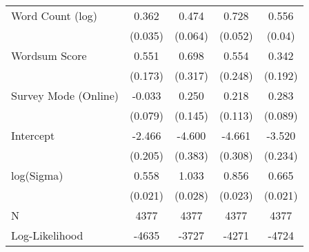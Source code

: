 \begin{table}[ht]
\begin{tabular}{lcccc}
  Word Count (log) &  0.362 &  0.474 &  0.728 &  0.556 \\ 
   & (0.035) & (0.064) & (0.052) & (0.04) \\ 
  Wordsum Score &  0.551 &  0.698 &  0.554 &  0.342 \\ 
   & (0.173) & (0.317) & (0.248) & (0.192) \\ 
  Survey Mode (Online) & -0.033 &  0.250 &  0.218 &  0.283 \\ 
   & (0.079) & (0.145) & (0.113) & (0.089) \\ 
  Intercept & -2.466 & -4.600 & -4.661 & -3.520 \\ 
   & (0.205) & (0.383) & (0.308) & (0.234) \\ 
  log(Sigma) &  0.558 &  1.033 &  0.856 &  0.665 \\ 
   & (0.021) & (0.028) & (0.023) & (0.021) \\ 
   \hline
N & 4377 & 4377 & 4377 & 4377 \\ 
  Log-Likelihood & -4635 & -3727 & -4271 & -4724 \\ 
   \hline
\end{tabular}
\endgroup
\end{table}
